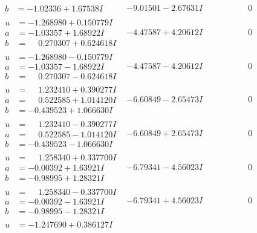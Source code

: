 \documentclass[1p]{elsarticle_modified}
\theoremstyle{definition}
\begin{document}
$$\begin{array}{c|c|c}
\begin{aligned}
b &= -1.02336 + 1.67538 I\end{aligned}
 & -9.01501 - 2.67631 I & \phantom{-0.000000 } 0 \\ \hline\begin{aligned}
u &= -1.268980 + 0.150779 I \\
a &= -1.03357 + 1.68922 I \\
b &= \phantom{-}0.270307 + 0.624618 I\end{aligned}
 & -4.47587 + 4.20612 I & \phantom{-0.000000 } 0 \\ \hline\begin{aligned}
u &= -1.268980 - 0.150779 I \\
a &= -1.03357 - 1.68922 I \\
b &= \phantom{-}0.270307 - 0.624618 I\end{aligned}
 & -4.47587 - 4.20612 I & \phantom{-0.000000 } 0 \\ \hline\begin{aligned}
u &= \phantom{-}1.232410 + 0.390277 I \\
a &= \phantom{-}0.522585 + 1.014120 I \\
b &= -0.439523 + 1.066630 I\end{aligned}
 & -6.60849 - 2.65473 I & \phantom{-0.000000 } 0 \\ \hline\begin{aligned}
u &= \phantom{-}1.232410 - 0.390277 I \\
a &= \phantom{-}0.522585 - 1.014120 I \\
b &= -0.439523 - 1.066630 I\end{aligned}
 & -6.60849 + 2.65473 I & \phantom{-0.000000 } 0 \\ \hline\begin{aligned}
u &= \phantom{-}1.258340 + 0.337700 I \\
a &= -0.00392 + 1.63921 I \\
b &= -0.98995 + 1.28321 I\end{aligned}
 & -6.79341 - 4.56023 I & \phantom{-0.000000 } 0 \\ \hline\begin{aligned}
u &= \phantom{-}1.258340 - 0.337700 I \\
a &= -0.00392 - 1.63921 I \\
b &= -0.98995 - 1.28321 I\end{aligned}
 & -6.79341 + 4.56023 I & \phantom{-0.000000 } 0 \\ \hline\begin{aligned}
u &= -1.247690 + 0.386127 I \\

\end{aligned}
\end{array}$$
\end{document}
